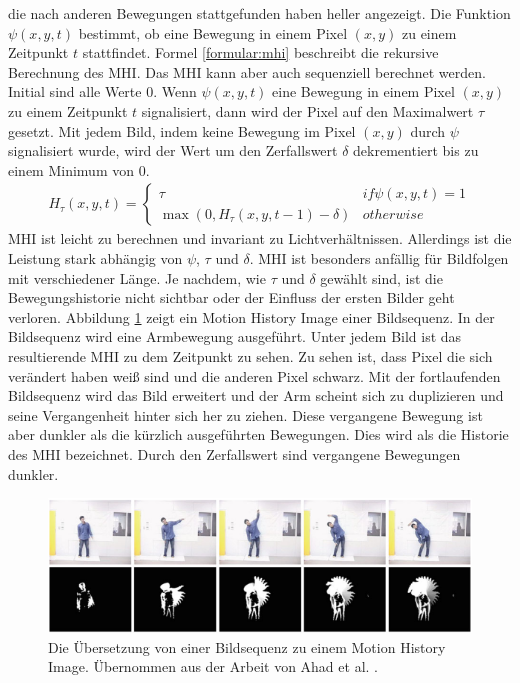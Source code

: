 die nach anderen Bewegungen stattgefunden haben heller angezeigt. Die Funktion $\psi(x,y,t)$ bestimmt, ob eine Bewegung in einem Pixel $(x,y)$ zu einem Zeitpunkt $t$ stattfindet.
\newline
\newline
Formel \ref{formular:mhi} beschreibt die rekursive Berechnung des MHI. Das MHI kann aber auch sequenziell berechnet werden. Initial sind alle Werte 0. Wenn $\psi(x,y,t)$ eine Bewegung in einem Pixel $(x,y)$
zu einem Zeitpunkt $t$ signalisiert, dann wird der Pixel auf den Maximalwert $\tau$ gesetzt. Mit jedem Bild, indem keine Bewegung im Pixel $(x,y)$ durch $\psi$ signalisiert wurde, wird der Wert um den
Zerfallswert $\delta$ dekrementiert bis zu einem Minimum von 0.
\begin{align}
    H_{\tau}(x,y,t) = \begin{cases}
                          \tau & if \psi(x,y,t) = 1 \\
                          \max(0, H_{\tau}(x,y,t-1) - \delta) & otherwise
    \end{cases}
    \label{formular:mhi}
\end{align}
MHI ist leicht zu berechnen und invariant zu Lichtverhältnissen. Allerdings ist die Leistung stark abhängig von $\psi$, $\tau$ und $\delta$. MHI ist besonders anfällig für Bildfolgen mit verschiedener Länge.
Je nachdem, wie $\tau$ und $\delta$ gewählt sind, ist die Bewegungshistorie nicht sichtbar oder der Einfluss der ersten Bilder geht verloren.
\newline
\newline
Abbildung \ref{fig:mhi_ex} zeigt ein Motion History Image einer Bildsequenz. In der Bildsequenz wird eine Armbewegung ausgeführt. Unter jedem Bild ist das resultierende MHI zu dem Zeitpunkt zu sehen.
Zu sehen ist, dass Pixel die sich verändert haben weiß sind und die anderen Pixel schwarz. Mit der fortlaufenden Bildsequenz wird das Bild erweitert und der Arm scheint sich zu duplizieren und seine
Vergangenheit hinter sich her zu ziehen. Diese vergangene Bewegung ist aber dunkler als die kürzlich ausgeführten Bewegungen. Dies wird als die Historie des MHI bezeichnet. Durch den Zerfallswert sind
vergangene Bewegungen dunkler.
\begin{figure}
    \centering
    \includegraphics[width=\linewidth]{images/mhi_ex.png}
    \caption{Die Übersetzung von einer Bildsequenz zu einem Motion History Image. Übernommen aus der Arbeit von Ahad et al. \cite{ahad2012motion}.}
    \label{fig:mhi_ex}
\end{figure}